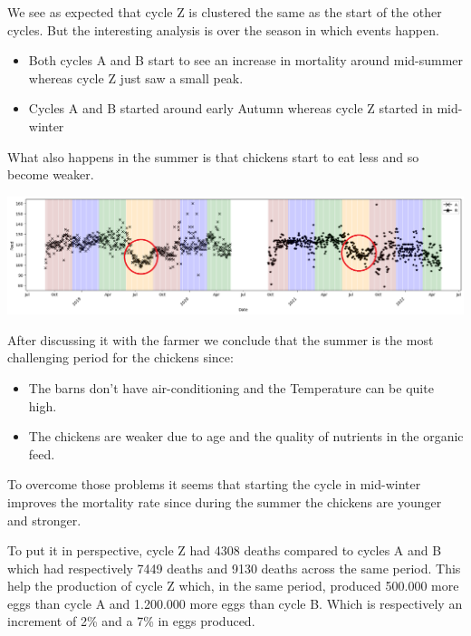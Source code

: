 \documentclass[11pt]{article}
\begin{document}
We see as expected that cycle Z is clustered the same as the start of the other cycles. But the interesting analysis is over the season in which events happen.

\begin{itemize}
    \item Both cycles A and B start to see an increase in mortality around mid-summer whereas cycle Z just saw a small peak.
    \item Cycles A and B started around early Autumn whereas cycle Z started in mid-winter
\end{itemize}

What also happens in the summer is that chickens start to eat less and so become weaker.

\includegraphics[width=\linewidth]{../Results/Comparison_Z_AB/feed_plot.png}

After discussing it with the farmer we conclude that the summer is the most challenging period for the chickens since:
\begin{itemize}
    \item The barns don't have air-conditioning and the Temperature can be quite high.
    \item The chickens are weaker due to age and the quality of nutrients in the organic feed.
\end{itemize}

To overcome those problems it seems that starting the cycle in mid-winter improves the mortality rate since during the summer the chickens are younger and stronger.

To put it in perspective, cycle Z had 4308 deaths compared to cycles A and B which had respectively 7449 deaths and 9130 deaths across the same period.
This help the production of cycle Z which, in the same period, produced 500.000 more eggs than cycle A and 1.200.000 more eggs than cycle B. Which is respectively an increment of 2\% and a 7\% in eggs produced.
\end{document}
